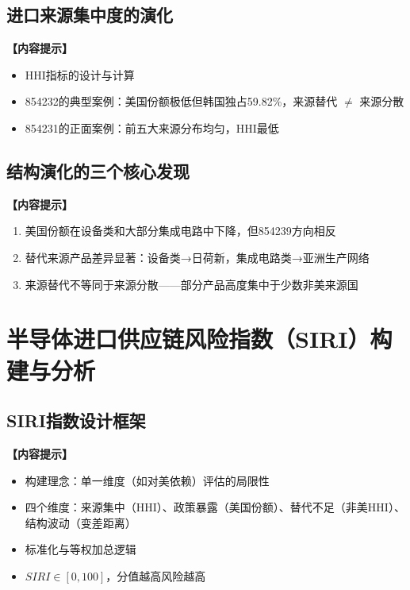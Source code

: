 \documentclass[UTF8,a4paper,12pt]{ctexart}
\begin{document}
\subsection{进口来源集中度的演化}
\noindent\textbf{【内容提示】}
\begin{itemize}[nosep]
    \item HHI指标的设计与计算
    \item 854232的典型案例：美国份额极低但韩国独占59.82\%，来源替代 $\ne$ 来源分散
    \item 854231的正面案例：前五大来源分布均匀，HHI最低
\end{itemize}

\subsection{结构演化的三个核心发现}
\noindent\textbf{【内容提示】}
\begin{enumerate}[nosep]
    \item 美国份额在设备类和大部分集成电路中下降，但854239方向相反
    \item 替代来源产品差异显著：设备类→日荷新，集成电路类→亚洲生产网络
    \item 来源替代不等同于来源分散——部分产品高度集中于少数非美来源国
\end{enumerate}

\section{半导体进口供应链风险指数（SIRI）构建与分析}

\subsection{SIRI指数设计框架}
\noindent\textbf{【内容提示】}
\begin{itemize}[nosep]
    \item 构建理念：单一维度（如对美依赖）评估的局限性
    \item 四个维度：来源集中（HHI）、政策暴露（美国份额）、替代不足（非美HHI）、结构波动（变差距离）
    \item 标准化与等权加总逻辑
    \item $SIRI \in [0, 100]$，分值越高风险越高
\end{itemize}
\end{document}
